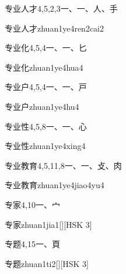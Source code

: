 \begin{entry}{专业人才}{4,5,2,3}{⼀、⼀、⼈、⼿}
  \begin{phonetics}{专业人才}{zhuan1ye4ren2cai2}
  \end{phonetics}
\end{entry}

\begin{entry}{专业化}{4,5,4}{⼀、⼀、⼔}
  \begin{phonetics}{专业化}{zhuan1ye4hua4}
  \end{phonetics}
\end{entry}

\begin{entry}{专业户}{4,5,4}{⼀、⼀、⼾}
  \begin{phonetics}{专业户}{zhuan1ye4hu4}
  \end{phonetics}
\end{entry}

\begin{entry}{专业性}{4,5,8}{⼀、⼀、⼼}
  \begin{phonetics}{专业性}{zhuan1ye4xing4}
  \end{phonetics}
\end{entry}

\begin{entry}{专业教育}{4,5,11,8}{⼀、⼀、⽁、⾁}
  \begin{phonetics}{专业教育}{zhuan1ye4jiao4yu4}
  \end{phonetics}
\end{entry}

\begin{entry}{专家}{4,10}{⼀、⼧}
  \begin{phonetics}{专家}{zhuan1jia1}[][HSK 3]
  \end{phonetics}
\end{entry}

\begin{entry}{专题}{4,15}{⼀、⾴}
  \begin{phonetics}{专题}{zhuan1ti2}[][HSK 3]
  \end{phonetics}
\end{entry}

